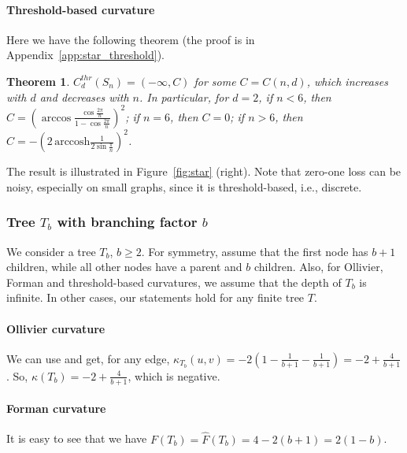 \documentclass{article} %
\newtheorem{theorem}{Theorem}[section]
\begin{document}
\paragraph{Threshold-based curvature} 
Here we have the following theorem (the proof is in Appendix~\ref{app:star_threshold}).

\begin{theorem}\label{thm:star_threshold}
$C_d^{thr}(S_n) = (-\infty, C)$ for some $C = C(n,d)$, which increases with $d$ and decreases with $n$. In particular, for $d = 2$, if $n < 6$, then $C = \left(\arccos \frac{\cos \frac{2\pi}{n}}{1 - \cos \frac{2\pi}{n}}\right)^2$; if $n = 6$, then $C = 0$; if $n > 6$, then $C = - \left(2\,\mathrm{arccosh}\frac{1}{2\sin \frac{\pi}{n}}\right)^2$.
\end{theorem}

The result is illustrated in Figure~\ref{fig:star} (right). Note that zero-one loss can be noisy, especially on small graphs, since it is threshold-based, i.e., discrete.

\subsubsection{Tree $T_b$ with branching factor $b$}


We consider a tree $T_b$, $b \ge 2$. For symmetry, assume that the first node has $b+1$ children, while all other nodes have a parent and $b$ children. Also, for Ollivier, Forman and threshold-based curvatures, we assume that the depth of $T_b$ is infinite. In other cases, our statements hold for any finite tree $T$.

\paragraph{Ollivier curvature} We can use  and get, for any edge,
$\kappa_{T_b}(u,v) = -2 \left(1 - \frac{1}{b+1} - \frac{1}{b+1} \right) = - 2 + \frac{4}{b+1}$. So, $\kappa(T_b) = -2 + \frac{4}{b+1}$, which is negative.

\paragraph{Forman curvature} 
It is easy to see that we have 
$F(T_b) = \hat F(T_b) = 4 - 2(b+1) = 2(1-b)$.
\end{document}
